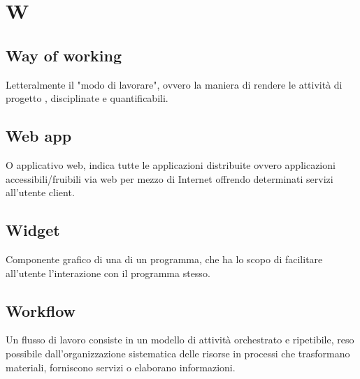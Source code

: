 \section*{W}
\markright{}

\subsection*{Way of working}
Letteralmente il "modo di lavorare", ovvero la maniera di rendere le attività di progetto , disciplinate e quantificabili.

\subsection*{Web app}
O applicativo web, indica tutte le applicazioni distribuite ovvero applicazioni accessibili/fruibili via web per mezzo di Internet offrendo determinati servizi all'utente client.

\subsection*{Widget}
Componente grafico di una  di un programma, che ha lo scopo di facilitare all'utente l'interazione con il programma stesso.

\subsection*{Workflow}
Un flusso di lavoro consiste in un modello di attività orchestrato e ripetibile, reso possibile dall'organizzazione sistematica delle risorse in processi che trasformano materiali, forniscono servizi o elaborano informazioni.